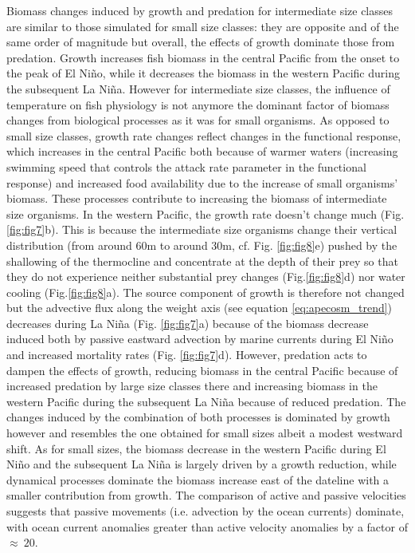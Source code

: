 Biomass changes induced by growth and predation for intermediate size classes are similar to those simulated for small size classes: they are opposite and of the same order of magnitude but overall, the effects of growth dominate those from predation. Growth increases fish biomass in the central Pacific from the onset to the peak of El Niño, while it decreases the biomass in the western Pacific during the subsequent La Niña. However for intermediate size classes, the influence of temperature on fish physiology is not anymore the dominant factor of biomass changes from biological processes as it was for small organisms. As opposed to small size classes, growth rate changes reflect changes in the functional response, which increases in the central Pacific both because of warmer waters (increasing swimming speed that controls the attack rate parameter in the functional response) and increased food availability due to the increase of small organisms' biomass. These processes contribute to increasing the biomass of intermediate size organisms. In the western Pacific, the growth rate doesn't change much (Fig. \ref{fig:fig7}b). This is because the intermediate size organisms change their vertical distribution (from around 60m to around 30m, cf. Fig. \ref{fig:fig8}e) pushed by the shallowing of the thermocline and concentrate at the depth of their prey so that they do not experience neither substantial prey changes (Fig.\ref{fig:fig8}d) nor water cooling (Fig.\ref{fig:fig8}a). The source component of growth is therefore not changed but the advective flux along the weight axis (see equation \ref{eq:apecosm_trend}) decreases during La Niña (Fig. \ref{fig:fig7}a) because of the biomass decrease induced both by passive eastward advection by marine currents during El Niño and increased mortality rates (Fig. \ref{fig:fig7}d). However, predation acts to dampen the effects of growth, reducing biomass in the central Pacific because of increased predation by large size classes there and increasing biomass in the western Pacific during the subsequent La Niña because of reduced predation. The changes induced by the combination of both processes is dominated by growth however and resembles the one obtained for small sizes albeit a modest westward shift. As for small sizes, the biomass decrease in the western Pacific during El Niño and the subsequent La Niña is largely driven by a growth reduction, while dynamical processes dominate the biomass increase east of the dateline with a smaller contribution from growth.  The comparison of active and passive velocities suggests that passive movements (i.e. advection by the ocean currents) dominate, with ocean current anomalies greater than active velocity anomalies by a factor of $\approx\ 20$.

